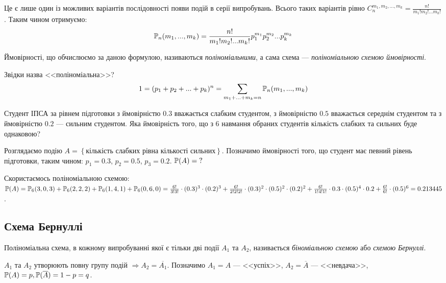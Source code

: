 Це є лише один із можливих варіантів послідовності появи подій в серії випробувань. Всього таких варіантів 
рівно $C_n^{m_1, m_2, ..., m_k} = \frac{n!}{m_1!m_2! ... m_k!}$. Таким чином отримуємо:
\begin{equation}
    \P_n(m_1, ..., m_k) = \frac{n!}{m_1!m_2! ... m_k!} p_1^{m_1} p_2^{m_2} ... p_k^{m_k}
\end{equation}
\begin{definition}
    Ймовірності, що обчислюємо за даною формулою, називаються \emph{поліноміальними}, а 
    сама схема --- \emph{поліноміальною схемою ймовірності}. 
\end{definition}
\begin{remark} Звідки назва <<поліноміальна>>?
    $$1 = (p_1 + p_2 + ... + p_k)^n = \sum\limits_{m_1 + ... + m_k = n} \P_n(m_1, ..., m_k)$$
\end{remark}
\begin{example}
    Студент ІПСА за рівнем підготовки з ймовірністю $0.3$ вважається слабким студентом, 
    з ймовірністю $0.5$ вважається середнім студентом та 
    з ймовірністю $0.2$ --- сильним студентом. Яка ймовірність того, що з 6 навмання 
    обраних студентів кількість слабких та сильних буде однаковою?

    Розглядаємо подію $A = \left\{\text{кількість слабких рівна кількості сильних}\right\}$. 
    Позначимо ймовірності того, що студент має певний рівень підготовки, таким чином:
    $p_1 = 0.3$, $p_2 = 0.5$, $p_3 = 0.2$.
    $\P(A)=\text{?}$

    Скористаємось поліноміальною схемою:
    $\P(A) = \P_6(3, 0, 3) + \P_6(2, 2, 2) + \P_6(1, 4, 1) + \\ \P_6(0, 6, 0) = 
    \frac{6!}{3!3!}\cdot(0.3)^3 \cdot(0.2)^3 + \frac{6!}{2!2!2!}\cdot(0.3)^2 \cdot(0.5)^2 \cdot(0.2)^2 + 
    \frac{6!}{1!4!1!}\cdot0.3 \cdot(0.5)^4 \cdot 0.2 + \frac{6!}{6!} \cdot(0.5)^6 = 0.213445$.
\end{example}
\subsection{Схема Бернуллі}
\begin{definition}
    Поліноміальна схема, в кожному випробуванні якої є тільки дві події $A_1$ та $A_2$, 
    називається \emph{біноміальною схемою} або \emph{схемою Бернуллі}.
\end{definition}

$A_1$ та $A_2$ утворюють повну групу подій $\Rightarrow A_2 = \overline{A_1}$.
Позначимо $A_1 = A$ --- <<успіх>>, $A_2 = \overline{A}$ --- <<невдача>>, 
$\P(A) = p, \P(\overline{A}) = 1-p = q$.


